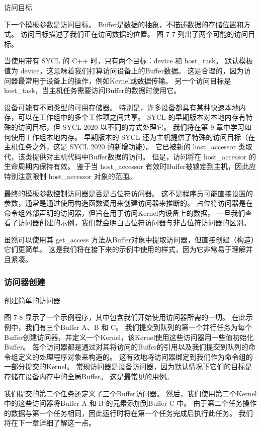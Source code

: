 {\color{red} 访问目标}

下一个模板参数是访问目标。 Buffer是数据的抽象，不描述数据的存储位置和方式。 
访问目标描述了我们正在访问数据的位置。 图 7-7 列出了两个可能的访问目标。

当使用带有 SYCL 的 C++ 时，只有两个目标：device 和 host\_task。 
默认模板值为 device，这意味着我们打算访问设备上的Buffer数据。 
这是合理的，因为访问器最常用于设备上的操作，例如Kernel或数据传输。 
另一个访问目标是 host\_task，当主机任务需要访问Buffer的数据时使用它。

设备可能有不同类型的可用存储器。 特别是，许多设备都具有某种快速本地内存，可以在工作组中的多个工作项之间共享。 
SYCL 的早期版本对本地内存有特殊的访问目标，但 SYCL 2020 以不同的方式处理它。 
我们将在第 9 章中学习如何使用工作组本地内存。
早期版本的 SYCL 还为主机提供了特殊的访问目标（在主机任务之外，这是 SYCL 2020 的新增功能）。 
它已被新的 host\_accessor 类取代，该类提供对主机代码中Buffer数据的访问。 
但是，访问将在 host\_accessor 的生命周期内保持有效。 
鉴于当 host\_accessor 有效时Buffer被锁定到主机，因此应特别注意限制 host\_accessor 对象的范围。

最终的模板参数控制访问器是否是占位符访问器。 
这不是程序员可能直接设置的参数，通常是通过使用构造函数调用来创建访问器来推断的。 
占位符访问器是在命令组外部声明的访问器，但旨在用于访问Kernel内设备上的数据。 
一旦我们查看了访问器创建的示例，我们就会明白占位符访问器与非占位符访问器的区别。

虽然可以使用其 get\_access 方法从Buffer对象中提取访问器，但直接创建（构造）它们更简单。 
这是我们将在接下来的示例中使用的样式，因为它非常易于理解并且紧凑。

\subsubsection{访问器创建}
{\color{red} 创建简单的访问器}

图 7-8 显示了一个示例程序，其中包含我们开始使用访问器所需的一切。 
在此示例中，我们有三个Buffer A、B 和 C。
我们提交到队列的第一个并行任务为每个Buffer创建访问器，并定义一个Kernel，该Kernel使用这些访问器用一些值初始化Buffer。 
每个访问器都是通过对其将访问的Buffer的引用以及我们提交到队列的命令组定义的处理程序对象来构造的。 
这有效地将访问器绑定到我们作为命令组的一部分提交的Kernel。 
常规访问器是设备访问器，因为默认情况下它们的目标是存储在设备内存中的全局Buffer。 这是最常见的用例。

我们提交的第二个任务还定义了三个Buffer访问器。 
然后，我们使用第二个Kernel中的这些访问器将Buffer A 和 B 的元素添加到Buffer C 中。
由于第二个任务操作的数据与第一个任务相同，因此运行时将在第一个任务完成后执行此任务。 
我们将在下一章详细了解这一点。

